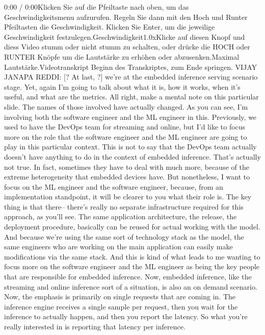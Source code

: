 {{{{{{{    0:00 / 0:00Klicken Sie auf die Pfeiltaste nach oben, um das Geschwindigkeitsmenu aufzurufen. Regeln Sie dann mit den Hoch und Runter Pfeiltasten die Geschwindigkeit. Klicken Sie Enter, um die jeweilige Geschwindigkeit festzulegen.Geschwindigkeit1.0xKlicke auf diesen Knopf und diess Video stumm oder nicht stumm zu schalten, oder drücke die HOCH oder RUNTER Knöpfe um die Lautstärke zu erhöhen oder abzusenken.Maximal Lautstärke.Videotranskript
    Beginn des Transkriptes, zum Ende springen.
    VIJAY JANAPA REDDI: [? At last, ?] we're at the embedded inference serving
    scenario stage.
    Yet, again I'm going to talk about what it is, how it works, when it's useful,
    and what are the metrics.
    All right, make a mental note on this particular slide.
    The names of those involved have actually changed.
    As you can see, I'm involving both the software engineer and the ML engineer
    in this.
    Previously, we used to have the DevOps team for streaming and online,
    but I'd like to focus more on the role that the software engineer and the ML
    engineer are going to play in this particular context.
    This is not to say that the DevOps team actually
    doesn't have anything to do in the context of embedded inference.
    That's actually not true.
    In fact, sometimes they have to deal with much more, because
    of the extreme heterogeneity that embedded devices have.
    But nonetheless, I want to focus on the ML engineer and the software engineer,
    because, from an implementation standpoint, it will be clearer to you
    what their role is.
    The key thing is that there--
    there's really no separate infrastructure required
    for this approach, as you'll see.
    The same application architecture, the release, the deployment procedure,
    basically can be reused for actual working with the model.
    And because we're using the same sort of technology stack as the model,
    the same engineers who are working on the main application
    can easily make modifications via the same stack.
    And this is kind of what leads to me wanting to focus more on the software
    engineer and the ML engineer as being the key people that
    are responsible for embedded inference.
    Now, embedded inference, like the streaming and online inference
    sort of a situation, is also an on demand scenario.
    Now, the emphasis is primarily on single requests that are coming in.
    The inference engine receives a single sample per request,
    then you wait for the inference to actually happen,
    and then you report the latency.
    So what you're really interested in is reporting that latency per inference.
}}}}}}}
